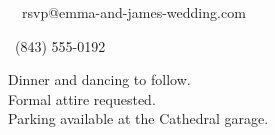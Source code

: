 \documentclass[
    language=english,
    doctype=wedding-invitation,
    institution=none,
]{../../omnilatex}
\begin{document}
\begin{center}
    \vspace{0.3cm}

    {\color{black!70}%
    \faEnvelope\ \ rsvp@emma-and-james-wedding.com}

    \vspace{0.3cm}

    {\color{black!70}%
    \faPhone\ (843) 555-0192}

    \vspace{1cm}

    {\small\color{black!60}%
    Dinner and dancing to follow.\\
    Formal attire requested.\\
    Parking available at the Cathedral garage.}

\end{center}
\end{document}
